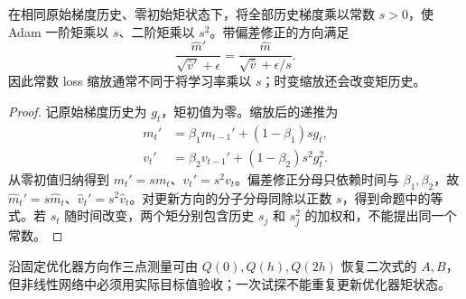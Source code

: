 \begin{proposition}
在相同原始梯度历史、零初始矩状态下，将全部历史梯度乘以常数 $s>0$，使 Adam 一阶矩乘以 $s$、二阶矩乘以 $s^2$。带偏差修正的方向满足
\begin{equation}
\frac{\widehat m'}{\sqrt{\widehat v'}+\epsilon}
=\frac{\widehat m}{\sqrt{\widehat v}+\epsilon/s}.
\end{equation}
因此常数 loss 缩放通常不同于将学习率乘以 $s$；时变缩放还会改变矩历史。
\end{proposition}
\begin{proof}
记原始梯度历史为 $g_t$，矩初值为零。缩放后的递推为
\begin{align}
m_t'&=\beta_1m_{t-1}'+(1-\beta_1)sg_t,\\
v_t'&=\beta_2v_{t-1}'+(1-\beta_2)s^2g_t^2.
\end{align}
从零初值归纳得到 $m_t'=sm_t$、$v_t'=s^2v_t$。偏差修正分母只依赖时间与 $\beta_1,\beta_2$，故 $\widehat m_t'=s\widehat m_t$、$\widehat v_t'=s^2\widehat v_t$。对更新方向的分子分母同除以正数 $s$，得到命题中的等式。若 $s_t$ 随时间改变，两个矩分别包含历史 $s_j$ 和 $s_j^2$ 的加权和，不能提出同一个常数。
\end{proof}

沿固定优化器方向作三点测量可由 $Q(0),Q(h),Q(2h)$ 恢复二次式的 $A,B$，但非线性网络中必须用实际目标值验收；一次试探不能重复更新优化器矩状态。


